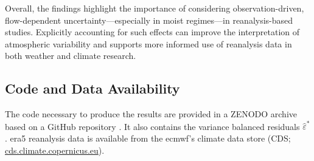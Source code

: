 Overall, the findings highlight the importance of considering observation-driven, flow-dependent uncertainty---especially in moist regimes---in reanalysis-based studies. Explicitly accounting for such effects can improve the interpretation of atmospheric variability and supports more informed use of reanalysis data in both weather and climate research.

\subsection*{Code and Data Availability}
The code necessary to produce the results are provided in a ZENODO archive based on a GitHub repository \parencite{henryschoellerIsolatingFlowdependentUncertainty2026}. It also contains the variance balanced residuals $\hat{\varepsilon}^*$. \gls{era5} reanalysis data is available from the \gls{ecmwf}'s climate data store (CDS; \url{cds.climate.copernicus.eu}).

